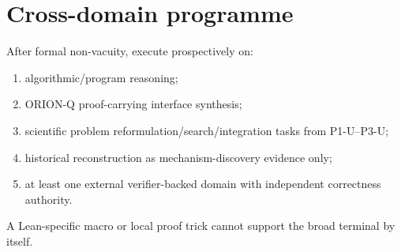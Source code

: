 \section{Cross-domain programme}
After formal non-vacuity, execute prospectively on:
\begin{enumerate}
    \item algorithmic/program reasoning;
    \item ORION-Q proof-carrying interface synthesis;
    \item scientific problem reformulation/search/integration tasks from P1-U--P3-U;
    \item historical reconstruction as mechanism-discovery evidence only;
    \item at least one external verifier-backed domain with independent correctness authority.
\end{enumerate}
A Lean-specific macro or local proof trick cannot support the broad terminal by itself.

